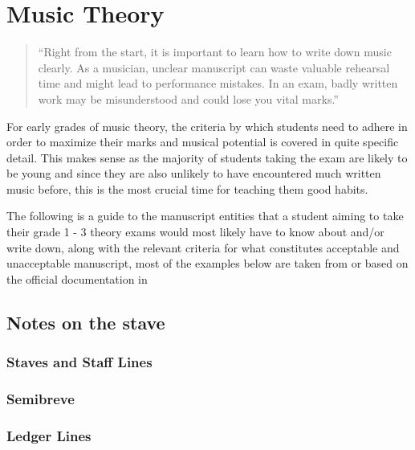 \section{Music Theory}

\blockquote{``Right from the start, it is important to learn how to write down music clearly. As a musician, unclear manuscript can waste valuable rehearsal time and might lead to performance mistakes. In an exam, badly written work may be misunderstood and could lose you vital marks.'' \parencite{taylor1989ab}}

For early grades of music theory, the criteria by which students need to adhere in order to maximize their marks and musical potential is covered in quite specific detail. This makes sense as the majority of students taking the exam are likely to be young and since they are also unlikely to have encountered much written music before, this is the most crucial time for teaching them good habits.

The following is a guide to the manuscript entities that a student aiming to take their grade 1 - 3 theory exams would most likely have to know about and/or write down, along with the relevant criteria for what constitutes acceptable and unacceptable manuscript, most of the examples below are taken from or based on the official documentation in \parencite{taylor2008music}


\subsection{Notes on the stave}

\subsubsection{Staves and Staff Lines}
\label{sec:music-theory-stave}

\subsubsection{Semibreve}



\subsubsection{Ledger Lines}


